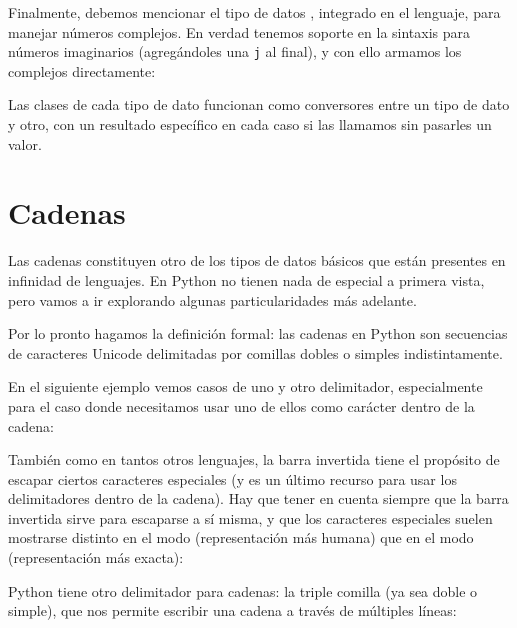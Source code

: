 
Finalmente, debemos mencionar el tipo de datos , integrado en el lenguaje, para manejar números complejos. En verdad tenemos soporte en la sintaxis para números imaginarios (agregándoles una \texttt{j} al final), y con ello armamos los complejos directamente:


Las clases de cada tipo de dato funcionan como conversores entre un tipo de dato y otro, con un resultado específico en cada caso si las llamamos sin pasarles un valor.



\section{Cadenas}\label{sec:cadenas}

Las cadenas constituyen otro de los tipos de datos básicos que están presentes en infinidad de lenguajes. En Python no tienen nada de especial a primera vista, pero vamos a ir explorando algunas particularidades más adelante.

Por lo pronto hagamos la definición formal: las cadenas en Python son secuencias de caracteres Unicode delimitadas por comillas dobles o simples indistintamente.

En el siguiente ejemplo vemos casos de uno y otro delimitador, especialmente para el caso donde necesitamos usar uno de ellos como carácter dentro de la cadena:


También como en tantos otros lenguajes, la barra invertida tiene el propósito de escapar ciertos caracteres especiales (y es un último recurso para usar los delimitadores dentro de la cadena). Hay que tener en cuenta siempre que la barra invertida sirve para escaparse a sí misma, y que los caracteres especiales suelen mostrarse distinto en el modo  (representación más humana) que en el modo  (representación más exacta):


Python tiene otro delimitador para cadenas: la triple comilla (ya sea doble o simple), que nos permite escribir una cadena a través de múltiples líneas:

